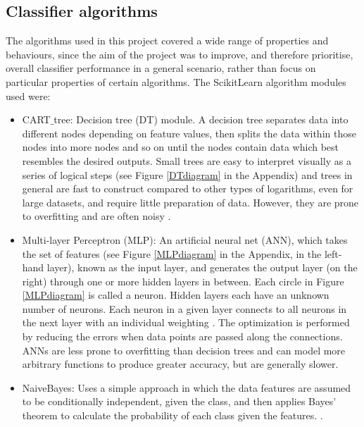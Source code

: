 \documentclass[12pt]{article}
\begin{document}
\subsection{Classifier algorithms}
The algorithms used in this project covered a wide range of properties and behaviours, since the aim of the project was to improve, and therefore prioritise, overall classifier performance in a general scenario, rather than focus on particular properties of certain algorithms. The ScikitLearn algorithm modules used \cite{scikit-learn} were:
\begin{itemize}
\item CART$\_$tree: Decision tree (DT) module. A decision tree separates data into different nodes depending on feature values, then splits the data within those nodes into more nodes and so on until the nodes contain data which best resembles the desired outputs. Small trees are easy to interpret visually as a series of logical steps (see Figure \ref{DTdiagram} in the Appendix) and trees in general are fast to construct compared to other types of logarithms, even for large datasets, and require little preparation of data. However, they are prone to overfitting and are often noisy \cite{friedman2001elements}.

\item Multi-layer Perceptron (MLP): An artificial neural net (ANN), which takes the set of features (see Figure \ref{MLPdiagram} in the Appendix, in the left-hand layer), known as the input layer, and generates the output layer (on the right) through one or more hidden layers in between. Each circle in Figure \ref{MLPdiagram} is called a neuron. Hidden layers each have an unknown number of neurons. Each neuron in a given layer connects to all neurons in the next layer with an individual weighting \cite{lisboa1993techniques}. The optimization is performed by reducing the errors when data points are passed along the connections. ANNs are less prone to overfitting than decision trees and can model more arbitrary functions to produce greater accuracy, but are generally slower.

\item NaiveBayes: Uses a simple approach in which the data features are assumed to be conditionally independent, given the class, and then applies Bayes' theorem to calculate the probability of each class given the features. \cite{john1995estimating}.


\end{itemize}
\end{document}
